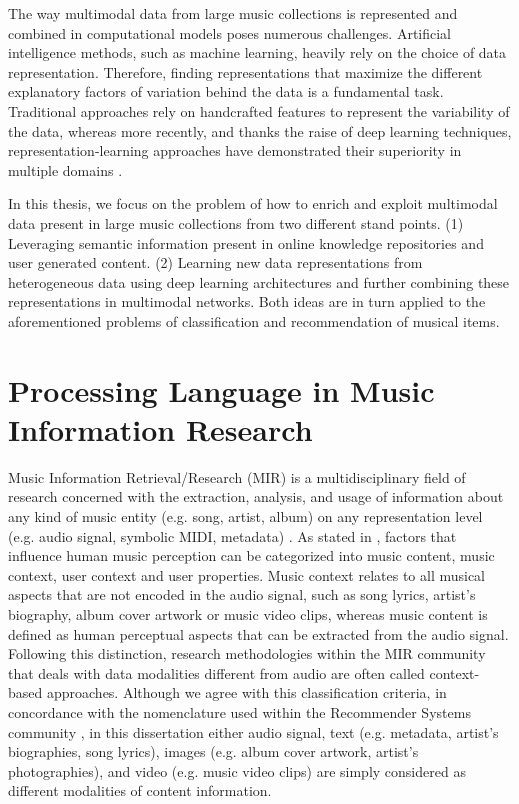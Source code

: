 The way multimodal data from large music collections is represented and combined in computational models poses numerous challenges. Artificial intelligence methods, such as machine learning, heavily rely on the choice of data representation. Therefore, finding representations that maximize the different explanatory factors of variation behind the data is a fundamental task. Traditional approaches rely on handcrafted features to represent the variability of the data, whereas more recently, and thanks the raise of deep learning techniques, representation-learning approaches have demonstrated their superiority in multiple domains \cite{bengio2013representation}.

In this thesis, we focus on the problem of how to enrich and exploit multimodal data present in large music collections from two different stand points. (1) Leveraging semantic information present in online knowledge repositories and user generated content. (2) Learning new data representations from heterogeneous data using deep learning architectures and further combining these representations in multimodal networks. Both ideas are in turn applied to the aforementioned problems of classification and recommendation of musical items.


\section{Processing Language in Music Information Research}
\label{sec:intro:nlp}

Music Information Retrieval/Research (MIR) is a multidisciplinary field of research concerned with the extraction, analysis, and usage of information about any kind of music entity (e.g. song, artist, album) on any representation level (e.g. audio signal, symbolic MIDI, metadata) \cite{schedl2008}. As stated in \cite{Schedl2013}, factors that influence human music perception can be categorized into music content, music context, user context and user properties. Music context relates to all musical aspects that are not encoded in the audio signal, such as song lyrics, artist's biography, album cover artwork or music video clips, whereas music content is defined as human perceptual aspects that can be extracted from the audio signal. Following this distinction, research methodologies within the MIR community that deals with data modalities different from audio are often called context-based approaches. 
Although we agree with this classification criteria, in concordance with the nomenclature used within the Recommender Systems community \cite{Ostuni2013}, in this dissertation either audio signal, text (e.g. metadata, artist's biographies, song lyrics), images (e.g. album cover artwork, artist's photographies), and video (e.g. music video clips) are simply considered as different modalities of content information.

